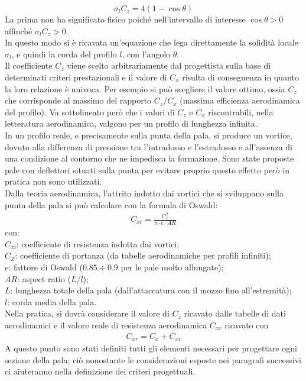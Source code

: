 \begin{equation}\label{eq:sigmazc}
\sigma_l C_z = 4 \left(1- \cos \theta \right)
\end{equation}
La prima non ha significato fisico poiché nell'intervallo di interesse $\cos \theta > 0 $ affinché $\sigma_l C_z > 0$.\\
In questo modo si è ricavata un'equazione che lega direttamente la solidità locale $\sigma_l$, e quindi la corda del profilo $l$, con l'angolo $\theta$.\\
Il coefficiente $C_z$ viene scelto arbitrariamente dal progettista sulla base di determinati criteri prestazionali e il valore di $C_x$ risulta di conseguenza in quanto la loro relazione è univoca. Per esempio si può scegliere il valore ottimo, ossia $C_z$ che corrisponde al massimo del rapporto $C_z/C_x$ (massima efficienza aerodinamica del profilo). Va sottolineato però che i valori di $C_z$ e $C_x$ riscontrabili, nella letteratura aerodinamica, valgono per un profilo di lunghezza infinita.\\
In un profilo reale, e precisamente sulla punta della pala, si produce un vortice, dovuto alla differenza di pressione tra l'intradosso e l'estradosso e all'assenza di una condizione al contorno che ne impedisca la formazione. Sono state proposte pale con deflettori situati sulla punta per evitare proprio questo effetto però in pratica non sono utilizzati.\\
Dalla teoria aerodinamica, l'attrito indotto dai vortici che si sviluppano sulla punta della pala si può calcolare con la formula di Oswald:
\begin{align*}
C_{xi} = \frac{C_z^2}{\pi \cdot e \cdot AR}
\end{align*}
con:\\[1mm]
$C_{xi}$: coefficiente di resistenza indotta dai vortici;\\
$C_Z$: coefficiente di portanza (da tabelle aerodinamiche per profili infiniti);\\
$e$: fattore di Oswald ($0.85 \div 0.9$ per le pale molto allungate);\\
$AR$: aspect ratio ($L/l$);\\
$L$: lunghezza totale della pala (dall'attaccatura con il mozzo fino all'estremità);\\
$l$: corda media della pala.\\[2mm]
Nella pratica, si dovrà considerare il valore di $C_z$ ricavato dalle tabelle di dati aerodinamici e il valore reale di resistenza aerodinamica $C_{xr}$ ricavato con
\begin{align*}
C_{xr} = C_x + C_{xi}
\end{align*}
A questo punto sono stati definiti tutti gli elementi necessari per progettare ogni sezione della pala; ciò nonostante le considerazioni esposte nei paragrafi successivi ci aiuteranno nella definizione dei criteri progettuali.

